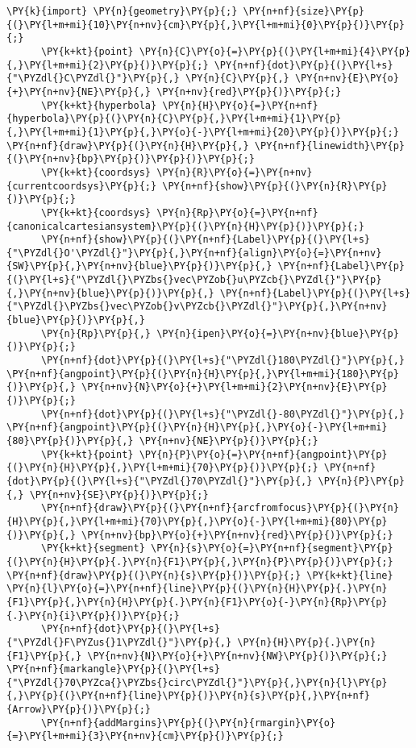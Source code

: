 \begin{Verbatim}[commandchars=\\\{\}]
      \PY{k}{import} \PY{n}{geometry}\PY{p}{;} \PY{n+nf}{size}\PY{p}{(}\PY{l+m+mi}{10}\PY{n+nv}{cm}\PY{p}{,}\PY{l+m+mi}{0}\PY{p}{)}\PY{p}{;}
      \PY{k+kt}{point} \PY{n}{C}\PY{o}{=}\PY{p}{(}\PY{l+m+mi}{4}\PY{p}{,}\PY{l+m+mi}{2}\PY{p}{)}\PY{p}{;} \PY{n+nf}{dot}\PY{p}{(}\PY{l+s}{"\PYZdl{}C\PYZdl{}"}\PY{p}{,} \PY{n}{C}\PY{p}{,} \PY{n+nv}{E}\PY{o}{+}\PY{n+nv}{NE}\PY{p}{,} \PY{n+nv}{red}\PY{p}{)}\PY{p}{;}
      \PY{k+kt}{hyperbola} \PY{n}{H}\PY{o}{=}\PY{n+nf}{hyperbola}\PY{p}{(}\PY{n}{C}\PY{p}{,}\PY{l+m+mi}{1}\PY{p}{,}\PY{l+m+mi}{1}\PY{p}{,}\PY{o}{-}\PY{l+m+mi}{20}\PY{p}{)}\PY{p}{;} \PY{n+nf}{draw}\PY{p}{(}\PY{n}{H}\PY{p}{,} \PY{n+nf}{linewidth}\PY{p}{(}\PY{n+nv}{bp}\PY{p}{)}\PY{p}{)}\PY{p}{;}
      \PY{k+kt}{coordsys} \PY{n}{R}\PY{o}{=}\PY{n+nv}{currentcoordsys}\PY{p}{;} \PY{n+nf}{show}\PY{p}{(}\PY{n}{R}\PY{p}{)}\PY{p}{;}
      \PY{k+kt}{coordsys} \PY{n}{Rp}\PY{o}{=}\PY{n+nf}{canonicalcartesiansystem}\PY{p}{(}\PY{n}{H}\PY{p}{)}\PY{p}{;}
      \PY{n+nf}{show}\PY{p}{(}\PY{n+nf}{Label}\PY{p}{(}\PY{l+s}{"\PYZdl{}O'\PYZdl{}"}\PY{p}{,}\PY{n+nf}{align}\PY{o}{=}\PY{n+nv}{SW}\PY{p}{,}\PY{n+nv}{blue}\PY{p}{)}\PY{p}{,} \PY{n+nf}{Label}\PY{p}{(}\PY{l+s}{"\PYZdl{}\PYZbs{}vec\PYZob{}u\PYZcb{}\PYZdl{}"}\PY{p}{,}\PY{n+nv}{blue}\PY{p}{)}\PY{p}{,} \PY{n+nf}{Label}\PY{p}{(}\PY{l+s}{"\PYZdl{}\PYZbs{}vec\PYZob{}v\PYZcb{}\PYZdl{}"}\PY{p}{,}\PY{n+nv}{blue}\PY{p}{)}\PY{p}{,}
      \PY{n}{Rp}\PY{p}{,} \PY{n}{ipen}\PY{o}{=}\PY{n+nv}{blue}\PY{p}{)}\PY{p}{;}
      \PY{n+nf}{dot}\PY{p}{(}\PY{l+s}{"\PYZdl{}180\PYZdl{}"}\PY{p}{,} \PY{n+nf}{angpoint}\PY{p}{(}\PY{n}{H}\PY{p}{,}\PY{l+m+mi}{180}\PY{p}{)}\PY{p}{,} \PY{n+nv}{N}\PY{o}{+}\PY{l+m+mi}{2}\PY{n+nv}{E}\PY{p}{)}\PY{p}{;}
      \PY{n+nf}{dot}\PY{p}{(}\PY{l+s}{"\PYZdl{}-80\PYZdl{}"}\PY{p}{,} \PY{n+nf}{angpoint}\PY{p}{(}\PY{n}{H}\PY{p}{,}\PY{o}{-}\PY{l+m+mi}{80}\PY{p}{)}\PY{p}{,} \PY{n+nv}{NE}\PY{p}{)}\PY{p}{;}
      \PY{k+kt}{point} \PY{n}{P}\PY{o}{=}\PY{n+nf}{angpoint}\PY{p}{(}\PY{n}{H}\PY{p}{,}\PY{l+m+mi}{70}\PY{p}{)}\PY{p}{;} \PY{n+nf}{dot}\PY{p}{(}\PY{l+s}{"\PYZdl{}70\PYZdl{}"}\PY{p}{,} \PY{n}{P}\PY{p}{,} \PY{n+nv}{SE}\PY{p}{)}\PY{p}{;}
      \PY{n+nf}{draw}\PY{p}{(}\PY{n+nf}{arcfromfocus}\PY{p}{(}\PY{n}{H}\PY{p}{,}\PY{l+m+mi}{70}\PY{p}{,}\PY{o}{-}\PY{l+m+mi}{80}\PY{p}{)}\PY{p}{,} \PY{n+nv}{bp}\PY{o}{+}\PY{n+nv}{red}\PY{p}{)}\PY{p}{;}
      \PY{k+kt}{segment} \PY{n}{s}\PY{o}{=}\PY{n+nf}{segment}\PY{p}{(}\PY{n}{H}\PY{p}{.}\PY{n}{F1}\PY{p}{,}\PY{n}{P}\PY{p}{)}\PY{p}{;} \PY{n+nf}{draw}\PY{p}{(}\PY{n}{s}\PY{p}{)}\PY{p}{;} \PY{k+kt}{line} \PY{n}{l}\PY{o}{=}\PY{n+nf}{line}\PY{p}{(}\PY{n}{H}\PY{p}{.}\PY{n}{F1}\PY{p}{,}\PY{n}{H}\PY{p}{.}\PY{n}{F1}\PY{o}{-}\PY{n}{Rp}\PY{p}{.}\PY{n}{i}\PY{p}{)}\PY{p}{;}
      \PY{n+nf}{dot}\PY{p}{(}\PY{l+s}{"\PYZdl{}F\PYZus{}1\PYZdl{}"}\PY{p}{,} \PY{n}{H}\PY{p}{.}\PY{n}{F1}\PY{p}{,} \PY{n+nv}{N}\PY{o}{+}\PY{n+nv}{NW}\PY{p}{)}\PY{p}{;} \PY{n+nf}{markangle}\PY{p}{(}\PY{l+s}{"\PYZdl{}70\PYZca{}\PYZbs{}circ\PYZdl{}"}\PY{p}{,}\PY{n}{l}\PY{p}{,}\PY{p}{(}\PY{n+nf}{line}\PY{p}{)}\PY{n}{s}\PY{p}{,}\PY{n+nf}{Arrow}\PY{p}{)}\PY{p}{;}
      \PY{n+nf}{addMargins}\PY{p}{(}\PY{n}{rmargin}\PY{o}{=}\PY{l+m+mi}{3}\PY{n+nv}{cm}\PY{p}{)}\PY{p}{;}
\end{Verbatim}
